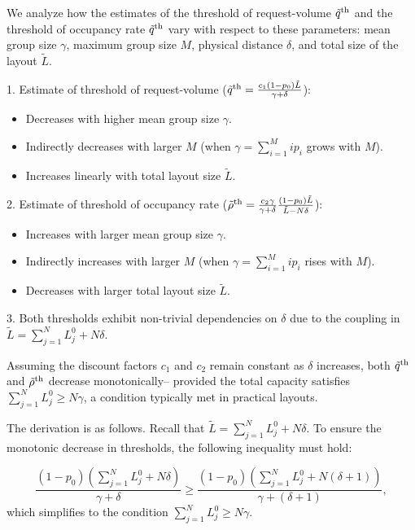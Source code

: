 We analyze how the estimates of the threshold of request-volume $\tilde{q}^{\textup{th}}$ and the threshold of occupancy rate $\tilde{q}^{\textup{th}}$ vary with respect to these parameters: mean group size $\gamma$, maximum group size $M$, physical distance $\delta$, and total size of the layout $\tilde{L}$.

1. Estimate of threshold of request-volume ($\tilde{q}^{\textup{th}} = \frac{c_1 (1-p_0) \tilde{L}}{\gamma + \delta}$):
\begin{itemize}
    \item Decreases with higher mean group size $\gamma$.
    \item Indirectly decreases with larger $M$ (when $\gamma = \sum_{i=1}^{M} i p_i$ grows with $M$).
    \item Increases linearly with total layout size $\tilde{L}$.
\end{itemize}

2. Estimate of threshold of occupancy rate ($\tilde{\rho}^{\textup{th}} = \frac{c_2 \gamma}{\gamma +\delta} \frac{(1-p_0) \tilde{L}}{\tilde{L}-N \delta}$):
\begin{itemize}
    \item Increases with larger mean group size $\gamma$.
    \item Indirectly increases with larger $M$ (when $\gamma = \sum_{i=1}^{M} i p_i$ rises with $M$).
    \item Decreases with larger total layout size $\tilde{L}$.
\end{itemize}

3. Both thresholds exhibit non-trivial dependencies on $\delta$ due to the coupling in $\tilde{L} = \sum_{j =1}^{N} L_{j}^{0} + N \delta$. 

Assuming the discount factors $c_1$ and $c_2$ remain constant as $\delta$ increases, both $\tilde{q}^{\textup{th}}$ and $\tilde{\rho}^{\textup{th}}$ decrease monotonically-- provided the total capacity satisfies $\sum_{j=1}^{N} L_{j}^{0} \geq N \gamma$, a condition typically met in practical layouts.

The derivation is as follows. Recall that $\tilde{L} = \sum_{j =1}^{N} L_{j}^{0} + N \delta$. To ensure the monotonic decrease in thresholds, the following inequality must hold: 

$$\frac{(1-p_0) (\sum_{j =1}^{N} L_{j}^{0} + N \delta)}{\gamma + \delta} \geq \frac{(1-p_0) (\sum_{j =1}^{N} L_{j}^{0} + N (\delta +1))}{\gamma + (\delta +1)},$$ which simplifies to the condition $\sum_{j=1}^{N} L_{j}^{0} \geq N \gamma$.


